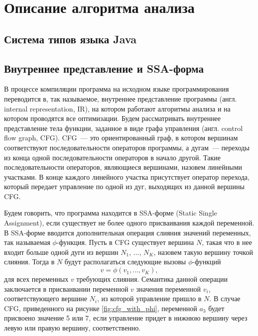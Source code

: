 \documentclass[14pt,titlepage]{extarticle}
\newenvironment{fresh}{\color{Blue}}{\color{black}}
\newcommand{\eng}[1]{{\English#1}}
\begin{document}
  \begin{fresh}
  \newpage
  \section{Описание алгоритма анализа}

    \subsection{Система типов языка Java}

    \subsection{Внутреннее представление и SSA-форма}

      В процессе компиляции программа на исходном языке программирования
      переводится в, так называемое, внутреннее представление программы
      (англ. \eng{internal representation, IR}), на котором работают
      алгоритмы анализа и на котором проводятся все оптимизации. Будем
      рассматривать внутреннее представление тела функции, заданное в виде
      графа управления (англ. \eng{control flow graph, CFG}). CFG~--- это
      ориентированный граф, в котором вершинам соответствуют последовательности
      операторов программы, а дугам~--- переходы из конца одной
      последовательности операторов в начало другой. Такие последовательности
      операторов, являющиеся вершинами, назовем линейными участками. В конце
      каждого линейного участка присутствует оператор перехода, который
      передает управление по одной из дуг, выходящих из данной вершины CFG.

      Будем говорить, что программа находится в SSA-форме (\eng{Static Single
      Assignment}), если существует не более одного присваивания каждой
      переменной. В SSA-форме вводится дополнительная операция слияния значений
      переменных, так называемая $\phi$-функция. Пусть в CFG существует вершина
      $N$, такая что в нее входит больше одной дуги из вершин
      $N_1$, ..., $N_K$, назовем такую вершину точкой слияния. Тогда в $N$
      будут располагаться следующие вызовы $\phi$-функций
      \[ v = \phi(v_1, ..., v_K), \]
      для всех переменных $v$ требующих слияния.
      Семантика данной операции заключается в присваивании переменной $v$
      значения переменной $v_i$, соответствующего вершине $N_i$, из которой
      управление пришло в $N$. В случае CFG, приведенного на рисунке
      \ref{fig:cfg_with_phi}, переменной $a_3$ будет присвоено значение 5 или
      7, если управление придет в нижнюю вершину через левую или правую
      вершину, соответственно.


\end{fresh}
\end{document}
